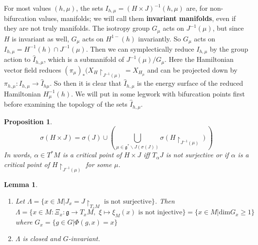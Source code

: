 \documentclass{article}
\newtheorem{prop}{Proposition}
\newtheorem{lem}{Lemma}
\begin{document}
For most values $(h,\mu)$, the sets $I_{h,\mu} = (H \times J)^{-1}(h,\mu)$ are, for non-bifurcation values, manifolds; we will call them \textbf{invariant manifolds}, even if they are not truly manifolds. The isotropy group $G_{\mu}$ acts on $J^{-1}(\mu)$, but since $H$ is invariant as well, $G_{\mu}$ acts on $H^{1-}(h)$ invariantly. So $G_{\mu}$ acts on $I_{h,\mu}=H^{-1}(h) \cap J^{-1}(\mu)$. Then we can symplectically reduce $I_{h,\mu}$ by the group action to $\widehat{I}_{h,\mu}$, which is a submanifold of $J^{-1}(\mu)/G_{\mu}$. Here the Hamiltonian vector field reduces $(\pi_{\mu})_*(X_H \restriction_{J^{-1}(\mu)} =  X_{H_{\mu}}$ and can be projected down by $\pi_{h,\mu}:I_{h,\mu} \to \widehat{I}_{h\mu}$. So then it is clear that $\widehat{I}_{h,\mu}$ is the energy surface of the reduced Hamiltonian $H_{\mu}^{-1}(h)$. We will put in some legwork with bifurcation points first before examining the topology of the sets $\widehat{I}_{h,\mu}$.

\begin{prop}

\begin{equation}
    \sigma(H \times J) = \sigma(J) \cup \left( \bigcup_{\mu \in \mathfrak{g}^*\backslash J(\sigma(J))} \sigma(H \restriction_{J^{-1}(\mu)}) \right)
\end{equation}
\indent In words, $\alpha \in T^*M$ is a critical point of $H \times J$ iff $T_{\alpha}J$ is not surjective or if $\alpha$ is a critical point of $H \restriction_{J^{-1}(\mu)}$ for some $\mu$.
\end{prop}

\begin{lem}
\begin{enumerate}
    \item Let $\Lambda = \{ x \in M \vert J_x = J \restriction_{T_x M} \text{ is not surjective} \}$. Then $\Lambda = \{ x \in M: \Xi_x: \mathfrak{g} \to T_x M, \hspace{4pt} \xi \mapsto \xi_M(x) \text{ is not injective} \} = \{ x \in M \vert \mathrm{dim}G_x \geq 1 \}$ where $G_x = \{g \in G \vert \Phi(g,x)=x \}$
    \item $\Lambda$ is closed and $G$-invariant.
\end{enumerate}
\end{lem}
\end{document}
